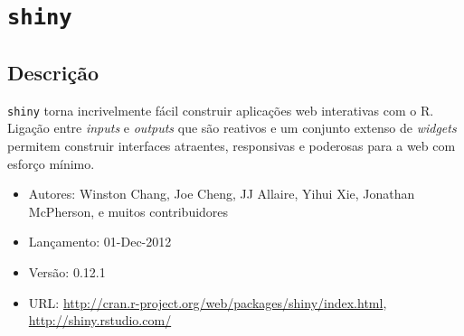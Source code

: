 \section{\texttt{shiny}}


\subsection{Descrição}

\begin{frame}

  \texttt{shiny} torna incrivelmente fácil construir aplicações web
  interativas com o R. Ligação entre \emph{inputs} e \emph{outputs} que
  são reativos e um conjunto extenso de \emph{widgets} permitem
  construir interfaces atraentes, responsivas e poderosas para a web com
  esforço mínimo.

  \begin{itemize}
  \item Autores: Winston Chang, Joe Cheng, JJ Allaire, Yihui Xie,
    Jonathan McPherson, e muitos contribuidores
  \item Lançamento: 01-Dec-2012
  \item Versão: 0.12.1
  \item URL:
    \url{http://cran.r-project.org/web/packages/shiny/index.html},
    \url{http://shiny.rstudio.com/}
  \end{itemize}

\end{frame}

